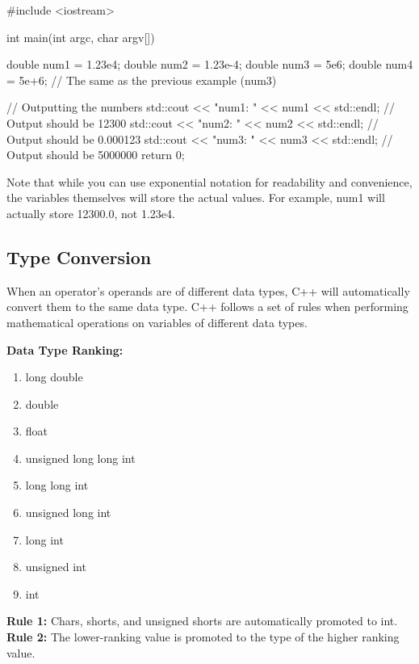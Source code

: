\documentclass{report}
\begin{document}
    \begin{cppcode}
#include <iostream>

int main(int argc, char argv[]){
    double num1 = 1.23e4;
    double num2 = 1.23e-4;
    double num3 = 5e6;
    double num4 = 5e+6; // The same as the previous example (num3)

    // Outputting the numbers
    std::cout << "num1: " << num1 << std::endl;  // Output should be 12300
    std::cout << "num2: " << num2 << std::endl;  // Output should be 0.000123
    std::cout << "num3: " << num3 << std::endl;  // Output should be 5000000
    return 0;
}
    \end{cppcode}
    
    \bigbreak \noindent 
    \begin{notebox}
			Note that while you can use exponential notation for readability and convenience, the variables themselves will store the actual values. For example, num1 will actually store 12300.0, not 1.23e4.
		\end{notebox}
    \bigbreak \noindent 
%     
%
%
%
%
%     

    \bigbreak \noindent   
    \subsection{Type Conversion}
    \begin{concept}
 When an operator's operands are of different data types, C++ will automatically convert them to the same data type. C++ follows a set of rules when performing mathematical operations on variables of different data types.
	\end{concept}
    \bigbreak \noindent 
    \textbf{Data Type Ranking:}
    \begin{enumerate}
        \item long double
        \item double 
        \item float
        \item unsigned long long int
        \item long long int
        \item unsigned long int
        \item long int
        \item unsigned int
        \item int
    \end{enumerate}
    \bigbreak \noindent 
    \textbf{Rule 1:} Chars, shorts, and unsigned shorts are automatically promoted to int.
    \bigbreak \noindent 
    \textbf{Rule 2:} The lower-ranking value is promoted to the type of the higher ranking value.
\end{document}
